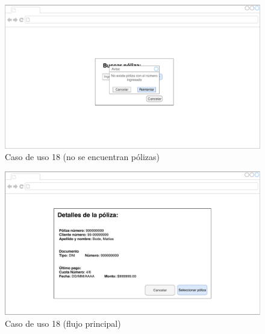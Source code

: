 \documentclass[12pt]{article}
\begin{document}
\vfill
\begin{figure}[h!]
\includegraphics[width=\textwidth]{CU18/CU-182.pdf}
\caption{Caso de uso 18 (no se encuentran pólizas)}
\end{figure}
\vfill

\vfill
\begin{figure}[h!]
\includegraphics[width=\textwidth]{CU18/CU-183.pdf}
\caption{Caso de uso 18 (flujo principal)}
\end{figure}
\vfill
\end{document}
